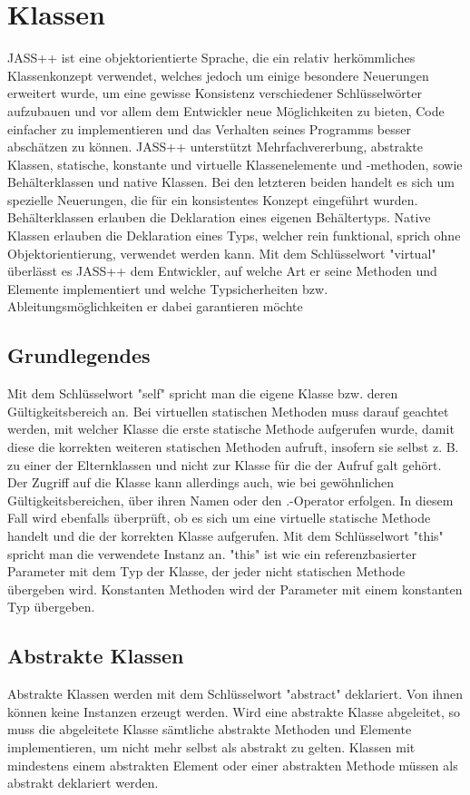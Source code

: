 \chapter{Klassen}
JASS++ ist eine objektorientierte Sprache, die ein relativ herkömmliches Klassenkonzept verwendet, welches jedoch um einige
besondere Neuerungen erweitert wurde, um eine gewisse Konsistenz verschiedener Schlüsselwörter aufzubauen und vor allem dem
Entwickler neue Möglichkeiten zu bieten, Code einfacher zu implementieren und das Verhalten seines Programms besser abschätzen
zu können.
JASS++ unterstützt Mehrfachvererbung, abstrakte Klassen, statische, konstante und virtuelle Klassenelemente und -methoden, sowie
Behälterklassen und native Klassen.
Bei den letzteren beiden handelt es sich um spezielle Neuerungen, die für ein konsistentes Konzept eingeführt wurden.
Behälterklassen erlauben die Deklaration eines eigenen Behältertyps.
Native Klassen erlauben die Deklaration eines Typs, welcher rein funktional, sprich ohne Objektorientierung, verwendet werden kann.
Mit dem Schlüsselwort "virtual" überlässt es JASS++ dem Entwickler, auf welche Art er seine Methoden und Elemente implementiert und
welche Typsicherheiten bzw. Ableitungsmöglichkeiten er dabei garantieren möchte

\section{Grundlegendes}
Mit dem Schlüsselwort "self" spricht man die eigene Klasse bzw. deren Gültigkeitsbereich an.
Bei virtuellen statischen Methoden muss darauf geachtet werden, mit welcher Klasse
die erste statische Methode aufgerufen wurde, damit diese die korrekten weiteren statischen Methoden aufruft, insofern sie selbst z. B. zu einer
der Elternklassen und nicht zur Klasse für die der Aufruf galt gehört.
Der Zugriff auf die Klasse kann allerdings auch, wie bei gewöhnlichen Gültigkeitsbereichen, über ihren Namen oder den .-Operator erfolgen.
In diesem Fall wird ebenfalls überprüft, ob es sich um eine virtuelle statische Methode handelt und die der korrekten Klasse aufgerufen.
Mit dem Schlüsselwort "this" spricht man die verwendete Instanz an. "this" ist wie ein referenzbasierter Parameter mit dem Typ
der Klasse, der jeder nicht statischen Methode übergeben wird.
Konstanten Methoden wird der Parameter mit einem konstanten Typ übergeben.

\section{Abstrakte Klassen}
Abstrakte Klassen werden mit dem Schlüsselwort "abstract" deklariert. Von ihnen können keine
Instanzen erzeugt werden. Wird eine abstrakte Klasse abgeleitet, so muss die abgeleitete Klasse sämtliche
abstrakte Methoden und Elemente implementieren, um nicht mehr selbst als abstrakt zu gelten.
Klassen mit mindestens einem abstrakten Element oder einer abstrakten Methode müssen als abstrakt deklariert werden.

